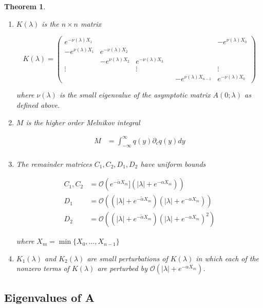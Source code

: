 \documentclass[12pt]{article}
\newtheorem{theorem}{Theorem}
\begin{document}
\begin{theorem}
\begin{enumerate}
\item $K(\lambda)$ is the $n \times n$ matrix

\begin{equation}\label{defKlambda}
K(\lambda) = 
\begin{pmatrix}
e^{-\nu(\lambda)X_1} & & & & & -e^{\nu(\lambda)X_0} \\
-e^{\nu(\lambda)X_1} & e^{-\nu(\lambda)X_2} \\
& -e^{\nu(\lambda)X_2} & e^{-\nu(\lambda)X_3} \\
\vdots & & \vdots & &&  \vdots \\
& & & & -e^{\nu(\lambda)X_{n-1}} & e^{-\nu(\lambda)X_0} 
\end{pmatrix}
\end{equation}

where $\nu(\lambda)$ is the small eigenvalue of the asymptotic matrix $A(0; \lambda)$ as defined above.

\item $M$ is the higher order Melnikov integral

\begin{align*}
M &= \int_{-\infty}^\infty q(y) \partial_c q(y) dy \\
\end{align*}

\item The remainder matrices $C_1, C_2, D_1, D_2$ have uniform bounds

\begin{align*}
C_1, C_2 &= \mathcal{O}(e^{-\tilde{\alpha}X_m}](|\lambda| + e^{-\alpha X_m})) \\
D_1 &= \mathcal{O}((|\lambda| + e^{-\tilde{\alpha} X_m})(|\lambda| + e^{-\alpha X_m})) \\
D_2 &= \mathcal{O}((|\lambda| + e^{-\tilde{\alpha} X_m})(|\lambda| + e^{-\alpha X_m})^2)
\end{align*}

where $X_m = \min \{X_0, \dots, X_{n-1}\}$

\item $K_1(\lambda)$ and $K_2(\lambda)$ are small perturbations of $K(\lambda)$ in which each of the nonzero terms of $K(\lambda)$ are perturbed by $\mathcal{O}(|\lambda| + e^{-\alpha X_m})$.

\end{enumerate}
\end{theorem}

\subsection{Eigenvalues of A}
\end{document}
